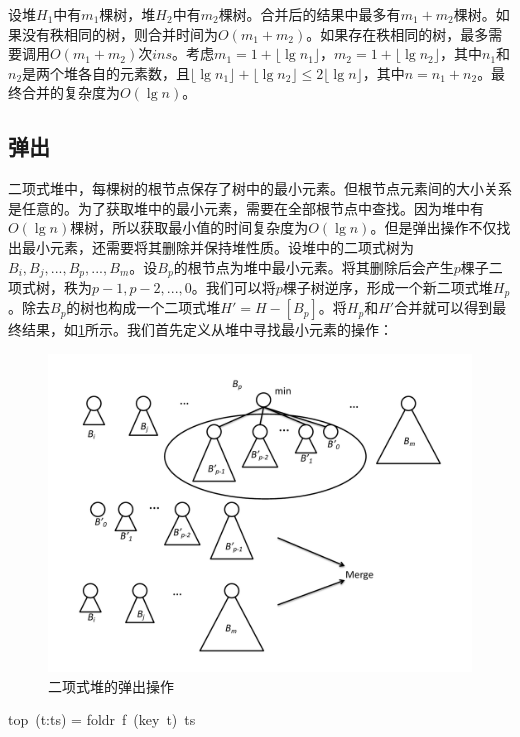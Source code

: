 \documentclass[b5paper]{ctexart}
\begin{document}
设堆$H_1$中有$m_1$棵树，堆$H_2$中有$m_2$棵树。合并后的结果中最多有$m_1 + m_2$棵树。如果没有秩相同的树，则合并时间为$O(m_1 + m_2)$。如果存在秩相同的树，最多需要调用$O(m_1 + m_2)$次$ins$。考虑$m_1 = 1 + \lfloor \lg n_1 \rfloor$，$m_2 = 1 + \lfloor \lg n_2 \rfloor$，其中$n_1$和$n_2$是两个堆各自的元素数，且$\lfloor \lg n_1 \rfloor + \lfloor \lg n_2 \rfloor \leq 2 \lfloor \lg n \rfloor$，其中$n = n_1 + n_2$。最终合并的复杂度为$O(\lg n)$。

\subsection{弹出}

二项式堆中，每棵树的根节点保存了树中的最小元素。但根节点元素间的大小关系是任意的。为了获取堆中的最小元素，需要在全部根节点中查找。因为堆中有$O(\lg n)$棵树，所以获取最小值的时间复杂度为$O(\lg n)$。但是弹出操作不仅找出最小元素，还需要将其删除并保持堆性质。设堆中的二项式树为$B_i, B_j, ..., B_p, ..., B_m$。设$B_p$的根节点为堆中最小元素。将其删除后会产生$p$棵子二项式树，秩为$p-1, p-2, ..., 0$。我们可以将$p$棵子树逆序，形成一个新二项式堆$H_p$。除去$B_p$的树也构成一个二项式堆$H' = H - [B_p]$。将$H_p$和$H'$合并就可以得到最终结果，如\cref{fig:bheap-del-min}所示。我们首先定义从堆中寻找最小元素的操作：

\begin{figure}[htbp]
  \centering
  \includegraphics[scale=0.4]{img/bheap-pop}
  \caption{二项式堆的弹出操作}
  \label{fig:bheap-del-min}
\end{figure}

\be
top\ (t:ts) = foldr\ f\ (key\ t)\ ts
\ee
\end{document}
